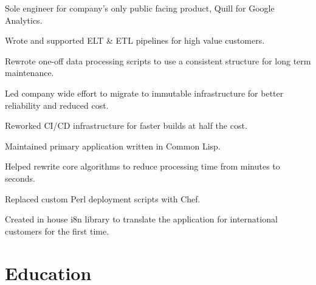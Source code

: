 \documentclass[]{deedy-resume-openfont}
\begin{document}
\sectionsep
{}
\vspace{\topsep}
\begin{tightemize}
\item Sole engineer for company's only public facing product, Quill for Google Analytics.
\item Wrote and supported ELT \& ETL pipelines for high value customers.
\item Rewrote one-off data processing scripts to use a consistent structure for long term maintenance.
\item Led company wide effort to migrate to immutable infrastructure for better reliability and reduced cost.
\item Reworked CI/CD infrastructure for faster builds at half the cost.
\end{tightemize}

\sectionsep
{}
\vspace{\topsep}
\begin{tightemize}
\item Maintained primary application written in Common Lisp.
\item Helped rewrite core algorithms to reduce processing time from minutes to seconds.
\item Replaced custom Perl deployment scripts with Chef.
\item Created in house i8n library to translate the application for international customers for the first time.
\end{tightemize}

\section{Education}
\sectionsep

\sectionsep
\end{document}
